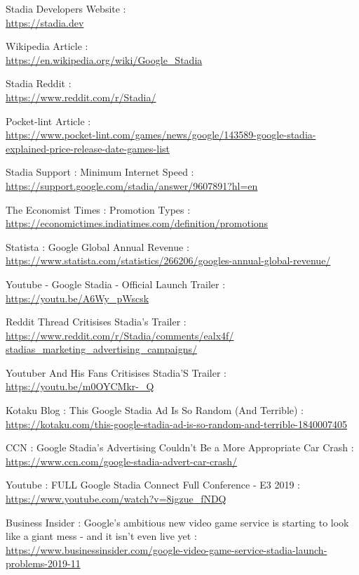 \documentclass[a4paper,12pt]{article}
\newcommand{\link}[1]{{\color{blue}\href{#1}{#1}}}
\begin{document}
\newpage
{}
\begin{thebibliography}{9}

Stadia Developers Website : \\ \link{https://stadia.dev}

Wikipedia Article : \\ \link{https://en.wikipedia.org/wiki/Google\_Stadia}

Stadia Reddit : \\ \link{https://www.reddit.com/r/Stadia/}

Pocket-lint Article : \\ \link{https://www.pocket-lint.com/games/news/google/143589-google-stadia-explained-price-release-date-games-list}

Stadia Support : Minimum Internet Speed : \\ \link{https://support.google.com/stadia/answer/9607891?hl=en}

The Economist Times : Promotion Types : \\ \link{https://economictimes.indiatimes.com/definition/promotions}

Statista : Google Global Annual Revenue : \\ \link{https://www.statista.com/statistics/266206/googles-annual-global-revenue/}

Youtube - Google Stadia - Official Launch Trailer : \\ \link{https://youtu.be/A6Wy\_pWscsk}

Reddit Thread Critisises Stadia's Trailer : \\ \link{https://www.reddit.com/r/Stadia/comments/ealx4f/\\stadias\_marketing\_advertising\_campaigns/}

Youtuber And His Fans Critisises Stadia'S Trailer : \\ \link{https://youtu.be/m0OYCMkr-\_Q}

Kotaku Blog : This Google Stadia Ad Is So Random (And Terrible) : \\ \link{https://kotaku.com/this-google-stadia-ad-is-so-random-and-terrible-1840007405}

CCN : Google Stadia's Advertising Couldn't Be a More Appropriate Car Crash : \\ \link{https://www.ccn.com/google-stadia-advert-car-crash/}

Youtube : FULL Google Stadia Connect Full Conference - E3 2019 : \\ \link{https://www.youtube.com/watch?v=8igzue\_fNDQ}

Business Insider : Google's ambitious new video game service is starting to look like a giant mess - and it isn't even live yet : \\ \link{https://www.businessinsider.com/google-video-game-service-stadia-launch-problems-2019-11}

\end{thebibliography}
\end{document}
